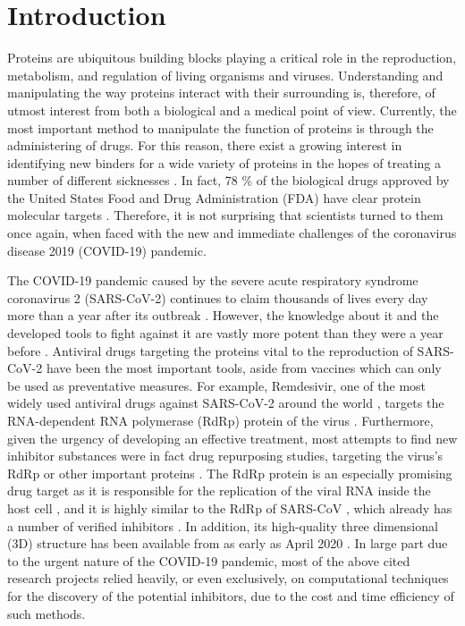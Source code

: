 \section{Introduction}

Proteins are ubiquitous building blocks playing a critical role in the reproduction, metabolism, and regulation of living organisms and viruses. Understanding and manipulating the way proteins interact with their surrounding is, therefore, of utmost interest from both a biological and a medical point of view. Currently, the most important method to manipulate the function of proteins is through the administering of drugs. For this reason, there exist a growing interest in identifying new binders for a wide variety of proteins in the hopes of treating a number of different sicknesses \cite{24clusters-vina,clusters_vina2,ensemble_screening,autodock_screen,tubercolosis_screen,cancer_inhibitor, vina_theory_practice}. In fact, 78 \% of the biological drugs approved by the United States Food and Drug Administration (FDA) have clear protein molecular targets \cite{how_many_targets}. Therefore, it is not surprising that scientists turned to them once again, when faced with the new and immediate challenges of the coronavirus disease 2019 (COVID-19) pandemic.    

The COVID-19 pandemic caused by the severe acute respiratory syndrome coronavirus 2 (SARS-CoV-2) continues to claim thousands of lives every day more than a year after its outbreak \cite{owidcoronavirus}.
However, the knowledge about it and the developed tools to fight against it are vastly more potent than they were a year before \cite{covid_review}.
Antiviral drugs targeting the proteins vital to the reproduction of SARS-CoV-2 have been the most important tools, aside from vaccines which can only be used as preventative measures.
For example, Remdesivir, one of the most widely used antiviral drugs against SARS-CoV-2 around the world \cite{remdesivir_meta}, targets the RNA-dependent RNA polymerase (RdRp) protein of the virus \cite{remdesivir_final}.
Furthermore, given the urgency of developing an effective treatment, most attempts to find new inhibitor substances were in fact drug repurposing studies, targeting the virus's RdRp \cite{rdrp,rdrp_virtual_screening,rdrp_virtual_screening2,rdrp_virtual_screening3,ml_inhibitors} or other important proteins \cite{ensemble_3clpro,main_protease_vs,3covid_proteins,papain-like}.
The RdRp protein is an especially promising drug target as it is responsible for the replication of the viral RNA inside the host cell \cite{rdrp_model}, and it is highly similar to the RdRp of SARS-CoV \cite{hcq_inhibitor}, which already has a number of verified inhibitors \cite{covid_proteins}. In addition, its high-quality three dimensional (3D) structure has been available from as early as April 2020 \cite{rdrp_structure}. In large part due to the urgent nature of the COVID-19 pandemic, most of the above cited research projects relied heavily, or even exclusively, on computational techniques for the discovery of the potential inhibitors, due to the cost and time efficiency of such methods.

